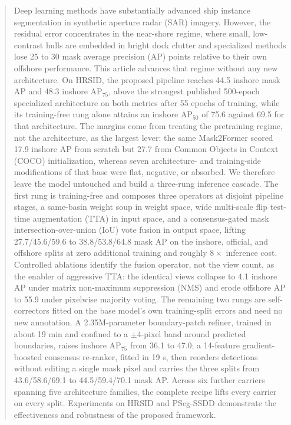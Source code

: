 
\begin{abstract}
Deep learning methods have substantially advanced ship instance segmentation in synthetic aperture radar (SAR) imagery. However, the residual error concentrates in the near-shore regime, where small, low-contrast hulls are embedded in bright dock clutter and specialized methods lose 25 to 30 mask average precision (AP) points relative to their own offshore performance. This article advances that regime without any new architecture. On HRSID, the proposed pipeline reaches 44.5 inshore mask AP and 48.3 inshore AP$_{75}$, above the strongest published 500-epoch specialized architecture on both metrics after 55 epochs of training, while its training-free rung alone attains an inshore AP$_{50}$ of 75.6 against 69.5 for that architecture. The margins come from treating the pretraining regime, not the architecture, as the largest lever: the same Mask2Former scored 17.9 inshore AP from scratch but 27.7 from Common Objects in Context (COCO) initialization, whereas seven architecture- and training-side modifications of that base were flat, negative, or absorbed. We therefore leave the model untouched and build a three-rung inference cascade. The first rung is training-free and composes three operators at disjoint pipeline stages, a same-basin weight soup in weight space, wide multi-scale flip test-time augmentation (TTA) in input space, and a consensus-gated mask intersection-over-union (IoU) vote fusion in output space, lifting 27.7/45.6/59.6 to 38.8/53.8/64.8 mask AP on the inshore, official, and offshore splits at zero additional training and roughly $8\times$ inference cost. Controlled ablations identify the fusion operator, not the view count, as the enabler of aggressive TTA: the identical views collapse to 4.1 inshore AP under matrix non-maximum suppression (NMS) and erode offshore AP to 55.9 under pixelwise majority voting. The remaining two rungs are self-correctors fitted on the base model's own training-split errors and need no new annotation. A 2.35M-parameter boundary-patch refiner, trained in about 19 min and confined to a $\pm 4$-pixel band around predicted boundaries, raises inshore AP$_{75}$ from 36.1 to 47.0; a 14-feature gradient-boosted consensus re-ranker, fitted in 19 s, then reorders detections without editing a single mask pixel and carries the three splits from 43.6/58.6/69.1 to 44.5/59.4/70.1 mask AP. Across six further carriers spanning five architecture families, the complete recipe lifts every carrier on every split. Experiments on HRSID and PSeg-SSDD demonstrate the effectiveness and robustness of the proposed framework.
\end{abstract}

